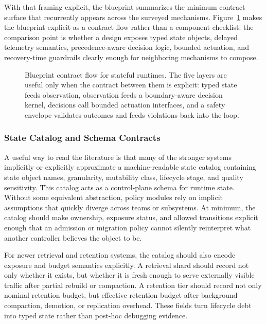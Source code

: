 \documentclass[acmsmall,screen,review]{acmart}
\begin{document}
With that framing explicit, the blueprint summarizes the minimum contract surface that recurrently appears across the surveyed mechanisms. Figure~\ref{fig:blueprint-flow} makes the blueprint explicit as a contract flow rather than a component checklist: the comparison point is whether a design exposes typed state objects, delayed telemetry semantics, precedence-aware decision logic, bounded actuation, and recovery-time guardrails clearly enough for neighboring mechanisms to compose.

\begin{figure}[t]
\centering
\resizebox{0.97\textwidth}{!}{}
\caption{Blueprint contract flow for stateful runtimes. The five layers are useful only when the contract between them is explicit: typed state feeds observation, observation feeds a boundary-aware decision kernel, decisions call bounded actuation interfaces, and a safety envelope validates outcomes and feeds violations back into the loop.}
\label{fig:blueprint-flow}
\end{figure}

\subsubsection{State Catalog and Schema Contracts}

A useful way to read the literature is that many of the stronger systems implicitly or explicitly approximate a machine-readable state catalog containing state object names, granularity, mutability class, lifecycle stage, and quality sensitivity. This catalog acts as a control-plane schema for runtime state. Without some equivalent abstraction, policy modules rely on implicit assumptions that quickly diverge across teams or subsystems. At minimum, the catalog should make ownership, exposure status, and allowed transitions explicit enough that an admission or migration policy cannot silently reinterpret what another controller believes the object to be.

For newer retrieval and retention systems, the catalog should also encode exposure and budget semantics explicitly. A retrieval shard should record not only whether it exists, but whether it is fresh enough to serve externally visible traffic after partial rebuild or compaction. A retention tier should record not only nominal retention budget, but effective retention budget after background compaction, demotion, or replication overhead. These fields turn lifecycle debt into typed state rather than post-hoc debugging evidence.
\end{document}
